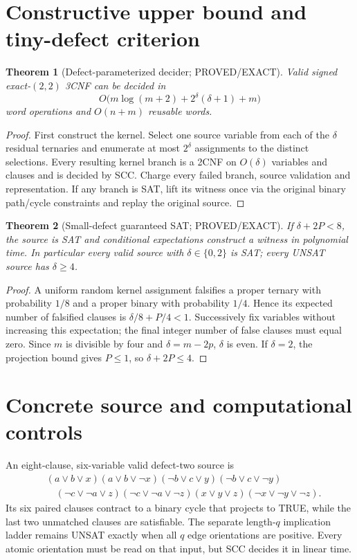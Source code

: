 \documentclass[11pt]{article}
\newtheorem{theorem}{Theorem}
\begin{document}
\section{Constructive upper bound and tiny-defect criterion}
\begin{theorem}[Defect-parameterized decider; PROVED/EXACT]
Valid signed exact-$(2,2)$ 3CNF can be decided in
\[
O\bigl(m\log(m+2)+2^\delta(\delta+1)+m\bigr)
\]
word operations and $O(n+m)$ reusable words.
\end{theorem}
\begin{proof}
First construct the kernel. Select one source variable from each of the $\delta$ residual ternaries and enumerate at most $2^\delta$ assignments to the distinct selections. Every resulting kernel branch is a 2CNF on $O(\delta)$ variables and clauses and is decided by SCC. Charge every failed branch, source validation and representation. If any branch is SAT, lift its witness once via the original binary path/cycle constraints and replay the original source.
\end{proof}
\begin{theorem}[Small-defect guaranteed SAT; PROVED/EXACT]
If $\delta+2P<8$, the source is SAT and conditional expectations construct a witness in polynomial time. In particular every valid source with $\delta\in\{0,2\}$ is SAT; every UNSAT source has $\delta\ge4$.
\end{theorem}
\begin{proof}
A uniform random kernel assignment falsifies a proper ternary with probability $1/8$ and a proper binary with probability $1/4$. Hence its expected number of falsified clauses is $\delta/8+P/4<1$. Successively fix variables without increasing this expectation; the final integer number of false clauses must equal zero. Since $m$ is divisible by four and $\delta=m-2p$, $\delta$ is even. If $\delta=2$, the projection bound gives $P\le1$, so $\delta+2P\le4$.
\end{proof}

\section{Concrete source and computational controls}
An eight-clause, six-variable valid defect-two source is
\[
\begin{split}
&(a\vee b\vee x)(a\vee b\vee\neg x)(\neg b\vee c\vee y)
(\neg b\vee c\vee\neg y)\\
&\quad(\neg c\vee\neg a\vee z)(\neg c\vee\neg a\vee\neg z)
(x\vee y\vee z)(\neg x\vee\neg y\vee\neg z).
\end{split}
\]
Its six paired clauses contract to a binary cycle that projects to TRUE, while the last two unmatched clauses are satisfiable. The separate length-$q$ implication ladder remains UNSAT exactly when all $q$ edge orientations are positive. Every atomic orientation must be read on that input, but SCC decides it in linear time.
\end{document}
